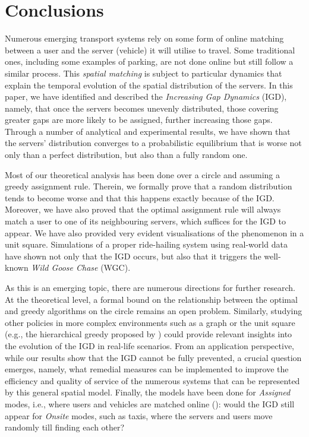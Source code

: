 \documentclass[12pt,english]{article}
\begin{document}
{\section{Conclusions}\label{sec:Conclusions}
Numerous emerging transport systems rely on some form of online matching between a user and the server (vehicle) it will utilise to travel.  Some traditional ones, including some examples of parking, are not done online but still follow a similar process. This \textit{spatial matching} is subject to particular dynamics that explain the temporal evolution of the spatial distribution of the servers. In this paper, we have identified and described the \textit{Increasing Gap Dynamics} (IGD), namely, that once the servers becomes unevenly distributed, those covering greater gaps are more likely to be assigned, further increasing those gaps. Through a number of analytical and experimental results, we have shown that the servers' distribution converges to a probabilistic equilibrium that is worse not only than a perfect distribution, but also than a fully random one.

Most of our theoretical analysis has been done over a circle and assuming a greedy assignment rule. Therein, we formally prove that a random distribution tends to become worse and that this happens exactly because of the IGD. Moreover, we have also proved that the optimal assignment rule will always match a user to one of its neighbouring servers, which suffices for the IGD to appear. We have also provided very evident visualisations of the phenomenon in a unit square. Simulations of a proper ride-hailing system using real-world data have shown not only that the IGD occurs, but also that it triggers the well-known \textit{Wild Goose Chase} (WGC).

As this is an emerging topic, there are numerous directions for further research. At the theoretical level, a formal bound on the relationship between the optimal and greedy algorithms on the circle remains an open problem. Similarly, studying other policies in more complex environments such as a graph or the unit square (e.g., the hierarchical greedy proposed by \citealt{kanoria2021dynamic}) could provide relevant insights into the evolution of the IGD in real-life scenarios. From an application perspective, while our results show that the IGD cannot be fully prevented, a crucial question emerges, namely, what remedial measures can be implemented to improve the efficiency and quality of service of the numerous systems that can be represented by this general spatial model. Finally, the models have been done for \textit{Assigned} modes, i.e., where users and vehicles are matched online (\citealt{fielbaum2025coordination}): would the IGD still appear for \textit{Onsite} modes, such as taxis, where the servers and users move randomly till finding each other?


}
\end{document}
